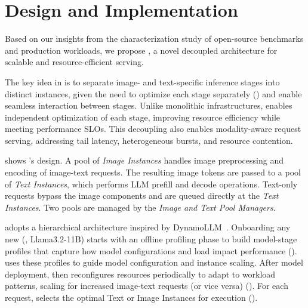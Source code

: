 \section{\sysname{} Design and Implementation}
Based on our insights from the characterization study of open-source \lmm{} benchmarks and production \lmm{} workloads, we propose \sysname, a novel decoupled architecture for scalable and resource-efficient \lmm{} serving.

The key idea in \sysname{} is to separate image- and text-specific inference stages into distinct instances, given the need to optimize each stage separately () and enable seamless interaction between stages.
Unlike monolithic infrastructures, \sysname{} enables independent optimization of each stage, improving resource efficiency while meeting performance SLOs.
This decoupling also enables modality-aware request serving, addressing tail latency, heterogeneous bursts, and resource contention.

 shows \sysname{}'s design.
A pool of \emph{Image Instances} handles image preprocessing and encoding of image-text requests.
The resulting image tokens are passed to a pool of \emph{Text Instances}, which performs LLM prefill and decode operations.
Text-only requests bypass the image components and are queued directly at the \emph{Text Instances}.
Two pools are managed by the \emph{Image and Text Pool Managers}.

\sysname{} adopts a hierarchical architecture inspired by DynamoLLM~\cite{stojkovic2024dynamollm}.
Onboarding any new \lmms{} (\eg{}, Llama3.2-11B) starts with an offline profiling phase to build model-stage profiles that capture how model configurations and load impact performance ().
\sysname{} uses these profiles to guide model configuration and instance scaling.
After model deployment, \sysname{} then reconfigures resources periodically to adapt to workload patterns, scaling for increased image-text requests (or vice versa) ().
For each request, \sysname{} selects the optimal \lmm{} Text or Image Instances for execution ().



